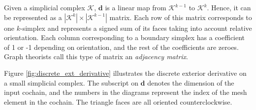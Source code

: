 \documentclass[utf8,english]{gradu3}
\begin{document}
Given a simplicial complex $\mathcal{K}$,
$\mathbf{d}$ is a linear map from $\mathcal{K}^{k-1}$ to $\mathcal{K}^k$.
Hence, it can be represented as a $|\mathcal{K}^k| \times |\mathcal{K}^{k-1}|$ matrix.
Each row of this matrix corresponds to one $k$-simplex
and represents a signed sum of its faces taking into account relative orientation.
Each column corresponding to a boundary simplex has a coefficient
of 1 or -1 depending on orientation,
and the rest of the coefficients are zeroes.
Graph theorists call this type of matrix an \textit{adjacency matrix}.

Figure \ref{fig:discrete_ext_derivative} illustrates
the discrete exterior derivative on a small simplicial complex.
The subscript on $\mathbf{d}$ denotes the dimension of the input cochain,
and the numbers in the diagrams represent the index of the mesh element in the cochain.
The triangle faces are all oriented counterclockwise.
\end{document}
